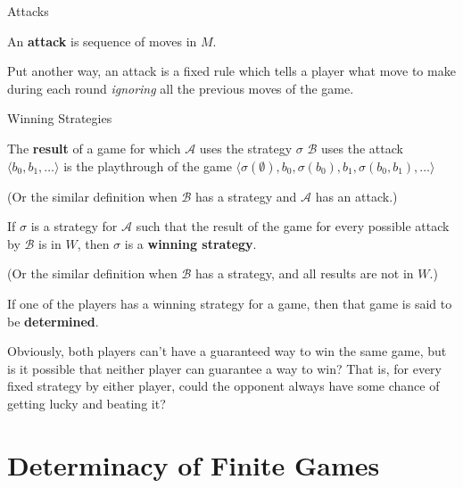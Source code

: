 \documentclass{beamer}
\theoremstyle{theorem}
\theoremstyle{definition}
\newcommand{\<}{\langle}
\renewcommand{\>}{\rangle}
\newcommand{\pl}[1]{\mathscr{#1}}
\newcommand{\term}[1]{\textbf{#1}}
\begin{document}
\begin{frame}{Attacks}
  \begin{definition}
    An \term{attack} is sequence of moves in $M$.
  \end{definition}

  \pause

  Put another way, an attack is a fixed rule which tells a player what move
  to make during each round \textit{ignoring} all the previous moves of
  the game.
\end{frame}

\begin{frame}{Winning Strategies}
  \begin{definition}
    The \term{result} of a game for which $\pl A$ uses the strategy $\sigma$
    $\pl B$ uses the attack $\<b_0,b_1,\dots\>$ is the playthrough of the
    game $\<\sigma(\emptyset),b_0,\sigma(b_0),b_1,\sigma(b_0,b_1),\dots\>$
  \end{definition}

  (Or the similar definition when $\pl B$ has a strategy and $\pl A$
  has an attack.)

  \pause

  \begin{definition}
    If $\sigma$ is a strategy for $\pl A$ such that the result of the game for
    every possible attack by $\pl B$ is in $W$, then $\sigma$ is a
    \term{winning strategy}.
  \end{definition}

  (Or the similar definition when $\pl B$ has a strategy, and all results
  are not in $W$.)
\end{frame}

\begin{frame}
  \begin{definition}
    If one of the players has a winning strategy for a game, then that
    game is said to be \term{determined}.
  \end{definition}

  Obviously, both players can't have a guaranteed way to win the same
  game, but is it possible that neither player can guarantee a way to win?
  That is, for every fixed strategy by either player, could the opponent
  always have some chance of getting lucky and beating it?
\end{frame}

\section{Determinacy of Finite Games}
\end{document}
